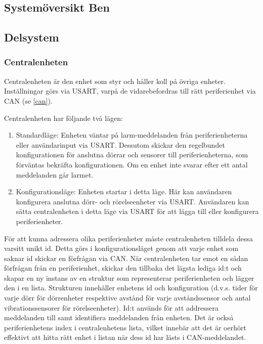 \documentclass{article}
\begin{document}
\subsection{Systemöversikt Ben}
\subsection{Delsystem }
\subsubsection{Centralenheten}
Centralenheten är den enhet som styr och håller koll på övriga enheter.
 Inställningar görs via USART, varpå de vidarebefordras till rätt
  periferienhet via CAN (se \ref{can}). 

Centralenheten har följande två lägen:

\begin{enumerate}
    \item Standardläge: Enheten väntar på larm-meddelanden från 
    periferienheterna eller användarinput via USART. Dessutom 
    skickar den regelbundet  konfigurationen för anslutna 
    dörrar och sensorer till periferienheterna, som förväntas 
    bekräfta konfigurationen. Om en enhet inte svarar efter 
    ett antal meddelanden går larmet.
    \item Konfigurationsläge: Enheten startar i detta läge.
     Här kan användaren konfigurera anslutna dörr- och 
     rörelseenheter via USART. Användaren kan sätta centralenheten
      i detta läge via USART för att lägga till eller konfigurera
       periferienheter.
\end{enumerate}

För att kunna adressera olika periferienheter måste centralenheten 
tilldela dessa varsitt unikt id. Detta görs i konfigurationsläget
genom att varje enhet som saknar id skickar en förfrågan via CAN.
När centralenheten tar emot en sådan förfrågan från en periferienhet, 
skickar den tillbaka det lägsta lediga id:t och skapar en ny instans
av en struktur som representerar periferienheten och lägger den i en
lista. Strukturen innehåller enhetens id och konfiguration (d.v.s.
tider för varje dörr för dörrenheter respektive avstånd för varje
avståndssensor och antal vibrationssensorer för rörelseenheter). 
Id:t används för att addressera meddelanden till samt identifiera 
meddelanden från enheten. Det är också periferienhetens index i 
centralenhetens lista, vilket innebär att det är oerhört effektivt
att hitta rätt enhet i listan när dess id har lästs i CAN-meddelandet.
\end{document}
